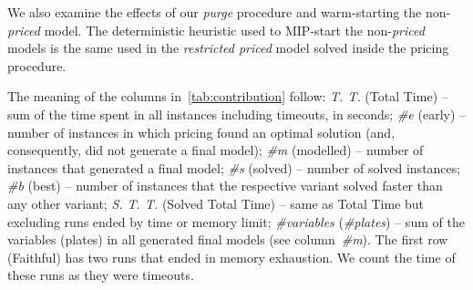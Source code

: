 \documentclass[ppgc,tese,english,formais,babel]{iiufrgs}
\begin{document}
We also examine the effects of our \emph{purge} procedure and warm-starting the non-\emph{priced} model.
The deterministic heuristic used to MIP-start the non-\emph{priced} models is the same used in the \emph{restricted priced} model solved inside the pricing procedure.

The meaning of the columns in~\cref{tab:contribution} follow:
\emph{T. T.} (Total Time) -- sum of the time spent in all instances including timeouts, in seconds;
\emph{\#e} (early) -- number of instances in which pricing found an optimal solution (and, consequently, did not generate a final model);
\emph{\#m} (modelled) -- number of instances that generated a final model;
\emph{\#s} (solved) -- number of solved instances;
\emph{\#b} (best) -- number of instances that the respective variant solved faster than any other variant;
\emph{S. T. T.} (Solved Total Time) -- same as Total Time but excluding runs ended by time or memory limit;
\emph{\#variables} (\emph{\#plates}) -- sum of the variables (plates) in all generated final models (see column~\emph{\#m}).
The first row (Faithful) has two runs that ended in memory exhaustion.
We count the time of these runs as they were timeouts.
\end{document}
